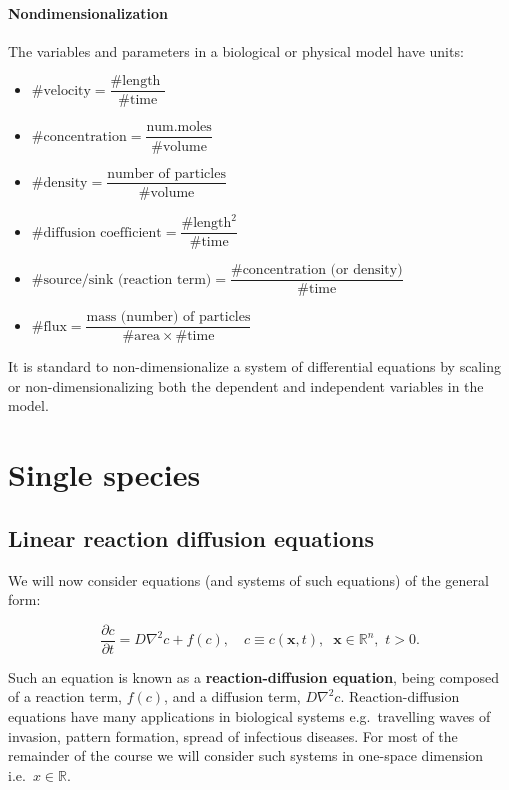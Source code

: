\documentclass[
  letterpaper,
  DIV=11,
  numbers=noendperiod]{scrreprt}
\providecommand{\tightlist}{%
  \setlength{\itemsep}{0pt}\setlength{\parskip}{0pt}}\usepackage{longtable,booktabs,array}
\theoremstyle{definition}
\theoremstyle{plain}
\theoremstyle{plain}
\theoremstyle{remark}
\begin{document}
\hypertarget{nondimensionalization}{%
\subsection{Nondimensionalization}\label{nondimensionalization}}

The variables and parameters in a biological or physical model have
units:

\begin{itemize}
\tightlist
\item
  \(\#\textrm{velocity} = \dfrac{\#\text{length }}{\#\text{time}}\)
\item
  \(\# \textrm{concentration} = \dfrac{ \text{num.moles}}{\#\text{volume}}\)
\item
  \(\#\text{density} = \dfrac{\text{number of particles}}{\# \text{volume}}\)
\item
  \(\#\text{diffusion coefficient} = \dfrac{\#\text{length}^2}{\#\text{time}}\)
\item
  \(\#\text{source/sink (reaction term)} = \dfrac{\#\text{concentration (or density)}}{\#\text{time}}\)
\item
  \(\#\text{flux} = \dfrac{\text{mass (number) of particles}}{\#\text{area} \times \# \text{time}}\)
\end{itemize}

It is standard to non-dimensionalize a system of differential equations
by scaling or non-dimensionalizing both the dependent and independent
variables in the model.

\part{Single species}

\hypertarget{linear-reaction-diffusion-equations}{%
\chapter{Linear reaction diffusion
equations}\label{linear-reaction-diffusion-equations}}

We will now consider equations (and systems of such equations) of the
general form:

\[
\frac{\partial c}{\partial t} = D \nabla^2 c + f(c), \quad c \equiv c( {\mathbf{x}} , t ), \;\;  {\mathbf{x}} \in \mathbb R^n, \, \, t >0.
\]

Such an equation is known as a \textbf{reaction-diffusion equation},
being composed of a reaction term, \(f(c)\), and a diffusion term,
\(D \nabla^2 c\). Reaction-diffusion equations have many applications in
biological systems e.g.~travelling waves of invasion, pattern formation,
spread of infectious diseases. For most of the remainder of the course
we will consider such systems in one-space dimension
i.e.~\(x \in \mathbb R\).
\end{document}
